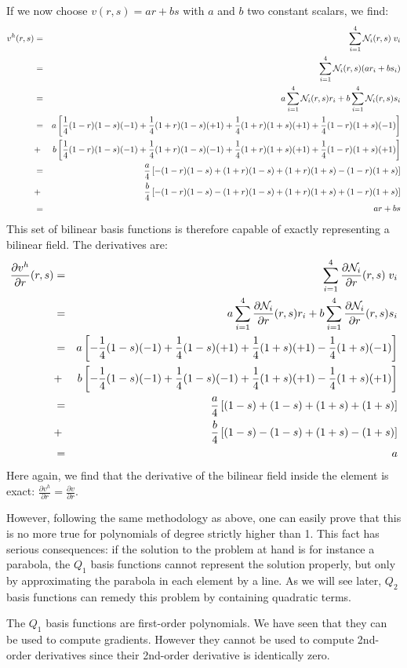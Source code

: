 If we now choose $v(r,s)=ar+bs$ with $a$ and $b$ two constant scalars, we find:
\begin{eqnarray}
v^h(r,s) 
&=& \sum_{i=1}^4 {\mathcal{N}}_i(r,s)\;  v_i  \nonumber\\
&=& \sum_{i=1}^4 {\mathcal{N}}_i(r,s) (ar_i+bs_i) \nonumber\\
&=& a \sum_{i=1}^4 {\mathcal{N}}_i(r,s) r_i + b \sum_{i=1}^4 {\mathcal{N}}_i(r,s) s_i \nonumber\\
&=& a \left[ 
 \frac14(1-r)(1-s)(-1)
+\frac14(1+r)(1-s)(+1)
+\frac14(1+r)(1+s)(+1)
+\frac14(1-r)(1+s)(-1) \right]  \nonumber\\
&+& b  
\left[ 
 \frac14(1-r)(1-s)(-1)
+\frac14(1+r)(1-s)(-1)
+\frac14(1+r)(1+s)(+1)
+\frac14(1-r)(1+s)(+1) \right]  \nonumber\\
&=& \frac{a}{4} \left[ 
-(1-r)(1-s)
+(1+r)(1-s)
+(1+r)(1+s)
-(1-r)(1+s) \right]  \nonumber\\
&+& \frac{b}{4}
\left[ 
-(1-r)(1-s)
-(1+r)(1-s)
+(1+r)(1+s)
+(1-r)(1+s) 
\right]  \nonumber\\
&=& ar+bs
\end{eqnarray}
This set of bilinear basis functions is therefore capable of exactly representing a bilinear field.
The derivatives are:
\begin{eqnarray}
\frac{\partial v^h}{\partial r}(r,s) 
&=& \sum_{i=1}^4 \frac{\partial {\mathcal{N}}_i}{\partial r}(r,s)\;  v_i  \nonumber\\
&=& a \sum_{i=1}^4 \frac{\partial {\mathcal{N}}_i}{\partial r}(r,s) r_i 
+ b \sum_{i=1}^4 \frac{\partial {\mathcal{N}}_i}{\partial r}(r,s) s_i \nonumber\\
&=& a \left[
- \frac14(1-s)(-1) 
+ \frac14(1-s)(+1) 
+ \frac14(1+s)(+1) 
- \frac14(1+s)(-1) 
\right] \nonumber\\
&+&b \left[
- \frac14(1-s)(-1) 
+ \frac14(1-s)(-1) 
+ \frac14(1+s)(+1) 
- \frac14(1+s)(+1) 
\right] \nonumber\\
&=& \frac{a}{4} \left[
 (1-s)
+ (1-s)
+ (1+s)
+ (1+s)
\right] \nonumber\\
&+&\frac{b}{4} \left[
 (1-s)
- (1-s)
+ (1+s)
- (1+s)
\right] \nonumber\\
&=& a 
\end{eqnarray}
Here again, we find that the derivative of the bilinear field inside the element is exact: 
$\frac{\partial v^h}{\partial r} = \frac{\partial v}{\partial r}$.

However, following the same methodology as above, one can easily prove 
that this is no more true for polynomials of degree strictly higher than 1. 
This fact has serious consequences: if the solution to the problem at hand is 
for instance a parabola, the $Q_1$ basis functions cannot represent the solution properly, 
but only by approximating the parabola in each element by a line. As we will see 
later, $Q_2$ basis functions can remedy this problem by containing quadratic terms.

\begin{remark}
The $Q_1$ basis functions are first-order polynomials. We have seen that they can be used to compute
gradients. However they cannot be used to compute 2nd-order derivatives since their 2nd-order
derivative is identically zero.
\end{remark}


